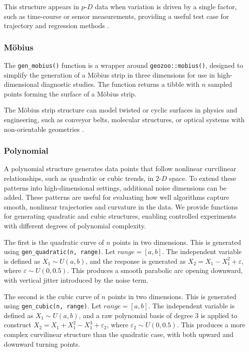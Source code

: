 This structure appears in \(p\text{-}D\) data when variation is driven by a single factor, such as time-course or sensor measurements, providing a useful test case for trajectory and regression methods \citep{trapnell2014}.

\subsubsection{Möbius}\label{muxf6bius}

The \texttt{gen\_mobius()} function is a wrapper around \texttt{geozoo::mobius()}, designed to simplify the generation of a Möbius strip in three dimensions for use in high-dimensional diagnostic studies. The function returns a tibble with \(n\) sampled points forming the surface of a Möbius strip.

The Möbius strip structure can model twisted or cyclic surfaces in physics and engineering, such as conveyor belts, molecular structures, or optical systems with non-orientable geometries \citep{optica2023}.

\subsubsection{Polynomial}\label{polynomial}

A polynomial structure generates data points that follow nonlinear curvilinear relationships, such as quadratic or cubic trends, in \(2\text{-}D\) space. To extend these patterns into high-dimensional settings, additional noise dimensions can be added. These patterns are useful for evaluating how well algorithms capture smooth, nonlinear trajectories and curvature in the data. We provide functions for generating quadratic and cubic structures, enabling controlled experiments with different degrees of polynomial complexity.

The first is the quadratic curve of \(n\) points in two dimensions. This is generated using \texttt{gen\_quadratic(n,\ range)}. Let \(range = [a, b]\). The independent variable is defined as \(X_1 \sim U(a, b)\), and the response is generated as \(X_2 = X_1 - X_1^2 + \varepsilon\), where \(\varepsilon \sim U(0, 0.5)\). This produces a smooth parabolic arc opening downward, with vertical jitter introduced by the noise term.

The second is the cubic curve of \(n\) points in two dimensions. This is generated using \texttt{gen\_cubic(n,\ range)}. Let \(range = [a, b]\). The independent variable is defined as \(X_1 \sim U(a, b)\), and a raw polynomial basis of degree \(3\) is applied to construct \(X_2 = X_1 + X_1^2 - X_1^3 + \varepsilon_2\), where \(\varepsilon_2 \sim U(0, 0.5)\). This produces a more complex curvilinear structure than the quadratic case, with both upward and downward turning points.

